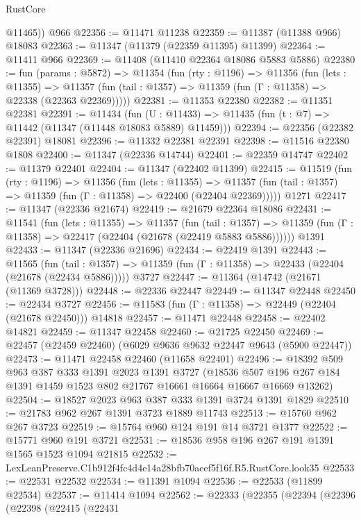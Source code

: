 \begin{lexlean}{RustCore}
\begin{coremodule}
        @11465))
    @966
@22356 := @11471 @11238
@22359 := @11387 (@11388 @966) @18083
@22363 := @11347 (@11379 (@22359 @11395) @11399)
@22364 := @11411 @966
@22369 := @11408 (@11410 @22364 @18086 @5883 @5886)
@22380 := fun (params : @5872) =>
  @11354
    (fun (rty : @1196) =>
    @11356
      (fun (lets : @11355) =>
      @11357 (fun (tail : @1357) => @11359 (fun (Γ : @11358) => @22338 (@22363 @22369)))))
@22381 := @11353 @22380
@22382 := @11351 @22381
@22391 := @11434
    (fun (U : @11433) => @11435 (fun (t : @7) => @11442 (@11347 (@11448 @18083 @5889) @11459)))
@22394 := @22356 (@22382 @22391) @18081
@22396 := @11332 @22381 @22391
@22398 := @11516 @22380 @1808
@22400 := @11347 (@22336 @14744)
@22401 := @22359 @14747
@22402 := @11379 @22401
@22404 := @11347 (@22402 @11399)
@22415 := @11519
    (fun (rty : @1196) =>
    @11356
      (fun (lets : @11355) =>
      @11357 (fun (tail : @1357) => @11359 (fun (Γ : @11358) => @22400 (@22404 @22369)))))
    @1271
@22417 := @11347 (@22336 @21674)
@22419 := @21679 @22364 @18086
@22431 := @11541
    (fun (lets : @11355) =>
    @11357
      (fun (tail : @1357) =>
      @11359 (fun (Γ : @11358) => @22417 (@22404 (@21678 (@22419 @5883 @5886))))))
    @1391
@22433 := @11347 (@22336 @21696)
@22434 := @22419 @1391
@22443 := @11565
    (fun (tail : @1357) => @11359 (fun (Γ : @11358) => @22433 (@22404 (@21678 (@22434 @5886)))))
    @3727
@22447 := @11364 (@14742 (@21671 (@11369 @3728)))
@22448 := @22336 @22447
@22449 := @11347 @22448
@22450 := @22434 @3727
@22456 := @11583 (fun (Γ : @11358) => @22449 (@22404 (@21678 @22450))) @14818
@22457 := @11471 @22448
@22458 := @22402 @14821
@22459 := @11347 @22458
@22460 := @21725 @22450
@22469 := @22457 (@22459 @22460) (@6029 @9636 @9632 @22447 @9643 (@5900 @22447))
@22473 := @11471 @22458 @22460 (@11658 @22401)
@22496 := @18392
    @509
    @963
    @387
    @333
    @1391
    @2023
    @1391
    @3727
    (@18536 @507 @196 @267 @184 @1391 @1459 @1523 @802 @21767 @16661 @16664 @16667 @16669 @13262)
@22504 := @18527 @2023 @963 @387 @333 @1391 @3724 @1391 @1829
@22510 := @21783 @962 @267 @1391 @3723 @1889 @11743
@22513 := @15760 @962 @267 @3723
@22519 := @15764 @960 @124 @191 @14 @3721 @1377
@22522 := @15771 @960 @191 @3721
@22531 := @18536 @958 @196 @267 @191 @1391 @1565 @1523 @1094 @21815
@22532 := LexLeanPreserve.C1b912f4fc4d4e14a28bfb70aeef5f16f.R5.RustCore.look35
@22533 := @22531 @22532
@22534 := @11391 @1094
@22536 := @22533 (@11899 @22534)
@22537 := @11414 @1094
@22562 := @22333
    (@22355
      (@22394
        (@22396
          (@22398
            (@22415
              (@22431

\end{coremodule}
\end{lexlean}
